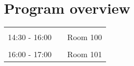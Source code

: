 \documentclass[12pt,a4paper]{article}
\begin{document}
 
 \setcounter{page}{24} 
    \pagestyle{fancy} 
\thispagestyle{empty}
\pagestyle{empty}
\section*{Program overview}
\begin{longtable}{p{35mm}p{105mm}r}
 & & \\ 
14:30 - 16:00 & \color{color1}{[O-oral-O1]} \color{color3}{Oral session name} & Room 100 \\ 
 & & \\ 
16:00 - 17:00 & \color{color1}{[O-oral-O2]} \color{color3}{Oral session 2} & Room 101 \\ 
\end{longtable}
\pagebreak
 
 
\end{document}

